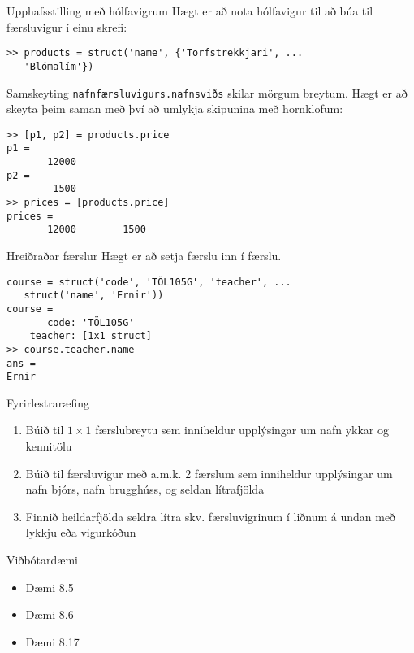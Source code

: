 \documentclass[handout]{beamer}
\begin{document}
\begin{frame}[fragile]{Upphafsstilling með hólfavigrum}
Hægt er að nota hólfavigur til að búa til færsluvigur í einu skrefi:

\begin{verbatim}
>> products = struct('name', {'Torfstrekkjari', ...
   'Blómalím'})
\end{verbatim}
\end{frame}

\begin{frame}[fragile]{Samskeyting}
\texttt{nafnfærsluvigurs.nafnsviðs} skilar mörgum breytum. Hægt er að skeyta þeim saman með því að umlykja skipunina með hornklofum:
\begin{verbatim}
>> [p1, p2] = products.price
p1 =
       12000
p2 =
        1500
>> prices = [products.price]
prices =
       12000        1500
\end{verbatim}
\end{frame}

\begin{frame}[fragile]{Hreiðraðar færslur}
Hægt er að setja færslu inn í færslu.

\begin{verbatim}
course = struct('code', 'TÖL105G', 'teacher', ...
   struct('name', 'Ernir'))
course = 
       code: 'TÖL105G'
    teacher: [1x1 struct]
>> course.teacher.name
ans =
Ernir
\end{verbatim}

\end{frame}

\begin{frame}{Fyrirlestraræfing}
    \begin{enumerate}
        \item Búið til $1 \times 1$ færslubreytu sem inniheldur upplýsingar um nafn ykkar og kennitölu
        \item Búið til færsluvigur með a.m.k. 2 færslum sem inniheldur upplýsingar um nafn bjórs, nafn brugghúss, og seldan lítrafjölda
        \item Finnið heildarfjölda seldra lítra skv. færsluvigrinum í liðnum á undan með lykkju eða vigurkóðun
    \end{enumerate}
\end{frame}

\begin{frame}{Viðbótardæmi}
    \begin{itemize}
        \item Dæmi 8.5
        \item Dæmi 8.6
        \item Dæmi 8.17
    \end{itemize}
\end{frame}
\end{document}
